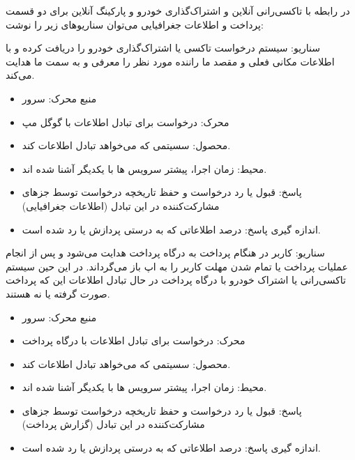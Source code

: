 در رابطه با تاکسی‌رانی آنلاین و اشتراک‌گذاری خودرو و پارکینگ آنلاین برای دو قسمت پرداخت و اطلاعات جغرافیایی می‌توان سناریو‌های زیر را نوشت:

سناریو: سیستم درخواست تاکسی یا اشتراک‌گذاری خودرو را دریافت کرده و با اطلاعات مکانی فعلی و مقصد ما راننده مورد نظر را معرفی و به سمت ما هدایت می‌کند.
\begin{itemize}
\item
منبع محرک: سرور
\item
محرک: درخواست برای تبادل اطلاعات با گوگل مپ
\item
محصول: سسیتمی که می‌خواهد تبادل اطلاعات کند.
\item
محیط: زمان اجرا، پیشتر سرویس ها با یکدیگر آشنا شده اند.
\item
پاسخ: قبول یا رد درخواست و حفظ تاریخچه درخواست توسط جز‌های مشارکت‌کننده در این تبادل (اطلاعات جغرافیایی)
\item
اندازه گیری پاسخ: درصد اطلاعاتی که به درستی پردازش یا رد شده است.
\end{itemize}

سناریو: کاربر در هنگام پرداخت به درگاه پرداخت هدایت می‌شود و  پس از انجام عملیات پرداخت یا تمام شدن مهلت کاربر را به اپ باز می‌گرداند. در این حین سیستم تاکسی‌رانی یا اشتراک خودرو با درگاه پرداخت در حال تبادل اطلاعات این که پرداخت صورت گرفته یا نه هستند. 

\begin{itemize}
\item
منبع محرک: سرور
\item
محرک: درخواست برای تبادل اطلاعات با درگاه پرداخت
\item
محصول: سسیتمی که می‌خواهد تبادل اطلاعات کند.
\item
محیط: زمان اجرا، پیشتر سرویس ها با یکدیگر آشنا شده اند.
\item
پاسخ: قبول یا رد درخواست و حفظ تاریخچه درخواست توسط جز‌های مشارکت‌کننده در این تبادل (گزارش پرداخت)
\item
اندازه گیری پاسخ: درصد اطلاعاتی که به درستی پردازش یا رد شده است.
\end{itemize}

